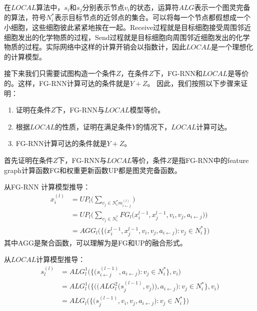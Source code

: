 在$LOCAL$算法中，$s_i$和$s_j$分别表示节点$v_i$的状态，运算符$ALG$表示一个图灵完备的算法，符号$N_i^*$表示目标节点的近邻点的集合。可以将每一个节点都假想成一个小细胞，这些细胞彼此紧紧地挨在一起。Receive过程就是目标细胞接受周围邻近细胞发出的化学物质的过程，Send过程就是目标细胞向周围邻近细胞发出的化学物质的过程。实际网络中这样的计算开销会以指数计，因此$LOCAL$是一个理想化的计算模型。
 
接下来我们只需要试图构造一个条件$Z$，在条件$Z$下，FG-RNN和$LOCAL$是等价的。这样，FG-RNN计算可达的条件就是$Y+Z$。
因此，我们按照以下步骤来证明：
\begin{enumerate}
  \item 证明在条件$Z$下，FG-RNN与$LOCAL$模型等价。
  \item 根据$LOCAL$的性质，证明在满足条件$Y$的情况下，$LOCAL$计算可达。
  \item FG-RNN计算可达的条件就是$Y+Z$。
\end{enumerate}

首先证明在条件$Z$下，FG-RNN与$LOCAL$等价，条件$Z$是指FG-RNN中的feature graph计算函数FG和权重更新函数UP都是图灵完备函数。

从FG-RNN 计算模型推导：
\begin{equation}
  \begin{aligned} 
  x_i^{(l)} &= UP_l \big(\sum_{v_j \in N_i^* m_{i\leftarrow j}^{(l)}} \big) \\
    &= UP_l \big(\sum_{v_j \in N_i^*} FG_l \big( x_i^{l-1}, x_j^{l-1}, v_i, v_j, a_{i\leftarrow j}\big) \big) \\
    &= AGG_l \big( \big\{ \big( x_i^{l-1}, x_j^{l-1}, v_i, v_j, a_{i\leftarrow j}\big) : v_j \in N_i^* \big\} \big)
  \end{aligned}  
\end{equation}
其中AGG是聚合函数，可以理解为是FG和UP的融合形式。

从$LOCAL$计算模型推导：
\begin{equation}
  \begin{aligned}
    s_l^{(l)} &= ALG_l^1 \big( \big\{ \big( s_{i\leftarrow j}^{(l - 1)}, a_{i\leftarrow j}\big) : v_j \in N_i^* \big\}, v_i\big) \\
    &= ALG_l^1 \big( \big\{ \big( \big( ALG_l^2 \big( s_j^{(l-1)}, v_j\big) \big), a_{i\leftarrow j}\big) : v_j \in N_i^* \big\}, v_i\big) \\
    &= ALG_l \big(\big\{\big(s_j^{(l-1)}, v_i, v_j,  a_{i\leftarrow j}\big): v_j \in N_i^* \big\}\big)
  \end{aligned}
\end{equation}

